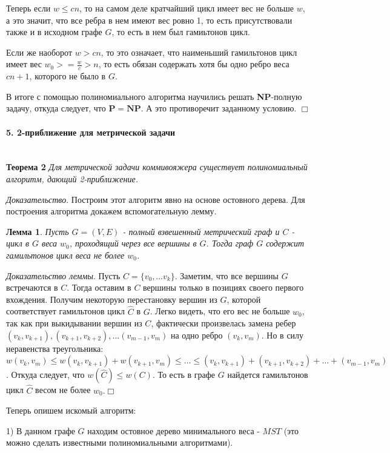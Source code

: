 \documentclass[14pt]{article}
\begin{document}
     Теперь если $w \leq cn$, то на самом деле кратчайший цикл имеет вес не больше $w$, а это значит, что все ребра в нем имеют вес ровно 1, то есть присутствовали также и в исходном графе $G$, то есть в нем был гамиьтонов цикл. 

     Если же наоборот $w > cn$, то это означает, что наименьший гамильтонов цикл имеет вес $w_0 >= \frac{w}{c} > n$, то есть обязан содержать хотя бы одно ребро веса $cn+1$, которого не было в $G$.

     В итоге с помощью полиномиального алгоритма научились решать \textbf{NP}-полную задачу, откуда следует, что $\mathbf{P} = \mathbf{NP}$. А это противоречит заданному условию. $\Box$


    \paragraph{\large{5. 2-приближение для метрической задачи}}\mbox{}\\

    \textbf{Теорема 2}\textit{ Для метрической задачи коммивояжера существует полиномиальный алгоритм, дающий 2-приближение.}

    \textit{Доказательство}. Построим этот алгоритм явно на основе остовного дерева. Для построения алгоритма докажем вспомогательную лемму.

    \textbf{Лемма 1}. \textit{Пусть $G = (V,E)$ - полный взвешенный метрический граф и $C$ - цикл в $G$ веса $w_0$, проходящий через все вершины в $G$. Тогда граф $G$ содержит гамильтонов цикл веса не более $w_0$.}

    \textit{Доказательство леммы}. Пусть $C = \{v_0, \dots v_k\}$. Заметим, что все вершины $G$ встречаются в $C$. Тогда оставим в $C$ вершины только в позициях своего первого вхождения. Получим некоторую перестановку вершин из $G$, которой соответствует гамильтонов цикл $\hat{C}$ в $G$. Легко видеть, что его вес не больше $w_0$, так как при выкидывании вершин из $C$, фактически произвелась замена ребер $(v_k, v_{k+1}), (v_{k+1}, v_{k+2}), \dots (v_{m-1}, v_m)$ на одно ребро $(v_k, v_m)$. Но в силу неравенства треугольника: $w(v_k,v_m) \leq w(v_k,v_{k+1}) + w(v_{k+1}, v_m) \leq \dots \leq (v_k, v_{k+1}) + (v_{k+1}, v_{k+2}) + \dots + (v_{m-1}, v_m)$. Откуда следует, что $w(\hat{C}) \leq w(C)$. То есть в графе $G$ найдется гамильтонов цикл $\hat{C}$ весом  не более $w_0.\Box$

    Теперь опишем искомый алгоритм:

    1) В данном графе $G$ находим остовное дерево минимального веса -  $MST$ (это можно сделать известными полиномиальными алгоритмами).
\end{document}
